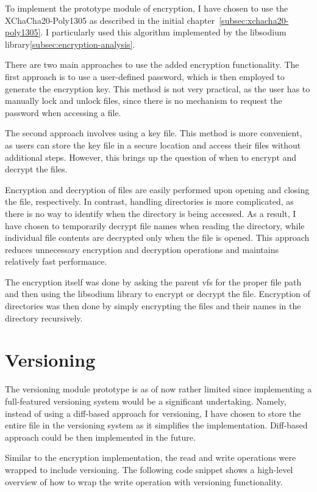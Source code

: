 To implement the prototype module of encryption, I have chosen to use the XChaCha20-Poly1305 as described in the initial chapter~\ref{subsec:xchacha20-poly1305}.
I particularly used this algorithm implemented by the libsodium library\ref{subsec:encryption-analysis}.

There are two main approaches to use the added encryption functionality.
The first approach is to use a user-defined password, which is then employed to generate the encryption key.
This method is not very practical, as the user has to manually lock and unlock files, since there is no mechanism to request the password when accessing a file.

The second approach involves using a key file.
This method is more convenient, as users can store the key file in a secure location and access their files without additional steps.
However, this brings up the question of when to encrypt and decrypt the files.

Encryption and decryption of files are easily performed upon opening and closing the file, respectively.
In contrast, handling directories is more complicated, as there is no way to identify when the directory is being accessed.
As a result, I have chosen to temporarily decrypt file names when reading the directory, while individual file contents are decrypted only when the file is opened.
This approach reduces unnecessary encryption and decryption operations and maintains relatively fast performance.

The encryption itself was done by asking the parent vfs for the proper file path and then using the libsodium library to encrypt or decrypt the file.
Encryption of directories was then done by simply encrypting the files and their names in the directory recursively.

\section{Versioning}\label{sec:versioning2}

The versioning module prototype is as of now rather limited since implementing a full-featured versioning system would be a significant undertaking.
Namely, instead of using a diff-based approach for versioning, I have chosen to store the entire file in the versioning system as it simplifies the implementation.
Diff-based approach could be then implemented in the future.

Similar to the encryption implementation, the read and write operations were wrapped to include versioning.
The following code snippet shows a high-level overview of how to wrap the write operation with versioning functionality.

